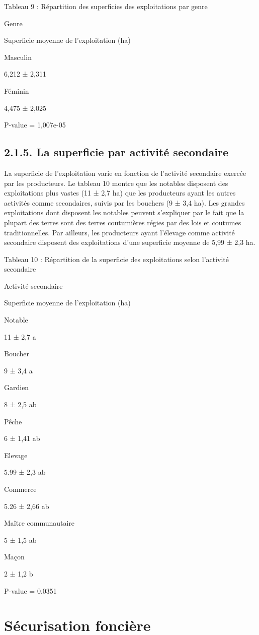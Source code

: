 \documentclass[12pt,oneside]{report}
\begin{document}
Tableau 9 : Répartition des superficies des exploitations par genre

Genre

Superficie moyenne de l'exploitation (ha)

Masculin

6,212 ± 2,311

Féminin

4,475 ± 2,025

P-value = 1,007e-05

\subsection{2.1.5. La superficie par activité secondaire}
La superficie de l’exploitation varie en fonction de l’activité secondaire exercée par les producteurs. Le tableau 10 montre que les notables disposent des exploitations plus vastes (11 ± 2,7 ha) que les producteurs ayant les autres activités comme secondaires, suivis par les bouchers (9 ± 3,4 ha). Les grandes exploitations dont disposent les notables peuvent s’expliquer par le fait que la plupart des terres sont des terres coutumières régies par des lois et coutumes traditionnelles. Par ailleurs, les producteurs ayant l’élevage comme activité secondaire disposent des exploitations d’une superficie moyenne de 5,99 ± 2,3 ha.

Tableau 10 : Répartition de la superficie des exploitations selon l’activité secondaire

Activité secondaire

Superficie moyenne de l'exploitation (ha)

Notable

11 ± 2,7 a

Boucher

9 ± 3,4 a

Gardien

8 ± 2,5 ab

Pêche

6 ± 1,41 ab

Elevage

5.99 ± 2,3 ab

Commerce

5.26 ± 2,66 ab

Maître communautaire

5 ± 1,5 ab

Maçon

2 ± 1,2 b

P-value = 0.0351

\section{Sécurisation foncière}
\end{document}
